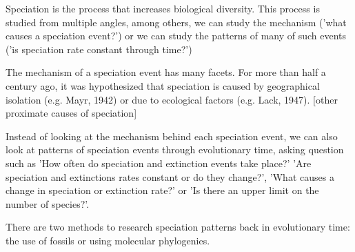 %
%
%
%

Speciation is the process that increases biological diversity.
This process is studied from multiple angles, among others,
we can study the mechanism ('what
causes a speciation event?') or we can study the patterns of many
of such events ('is speciation rate constant through time?')

%
%

The mechanism of a speciation event has many facets.
For more than half a century ago, it was hypothesized
that speciation is caused by geographical isolation (e.g. Mayr, 1942)
or due to ecological factors (e.g. Lack, 1947). [other proximate 
causes of speciation]

%

Instead of looking at the mechanism behind each speciation event,
we can also look at patterns of speciation events through evolutionary time,
asking question such as 'How often do speciation and extinction events take place?'
'Are speciation and extinctions rates constant or do they change?',
'What causes a change in speciation or extinction rate?' or
'Is there an upper limit on the number of species?'.

There are two methods to research speciation patterns back in evolutionary time:
the use of fossils or using molecular phylogenies.


